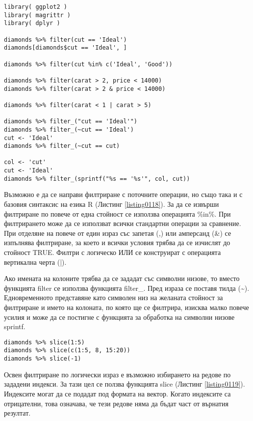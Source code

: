 \begin{lstlisting}[caption=Филтриране на редове, label=listing0118]
library( ggplot2 )
library( magrittr )
library( dplyr )

diamonds %>% filter(cut == 'Ideal')
diamonds[diamonds$cut == 'Ideal', ]

diamonds %>% filter(cut %in% c('Ideal', 'Good'))

diamonds %>% filter(carat > 2, price < 14000)
diamonds %>% filter(carat > 2 & price < 14000)

diamonds %>% filter(carat < 1 | carat > 5)

diamonds %>% filter_("cut == 'Ideal'")
diamonds %>% filter_(~cut == 'Ideal')
cut <- 'Ideal'
diamonds %>% filter_(~cut == cut)

col <- 'cut'
cut <- 'Ideal'
diamonds %>% filter_(sprintf("%s == '%s'", col, cut))
\end{lstlisting}

Възможно е да се направи филтриране с поточните операции, но също така и с базовия синтаксис на езика R (Листинг \ref{listing0118}). За да се извърши филтриране по повече от една стойност се използва операцията \%in\%. При филтрирането може да се използват всички стандартни операции за сравнение. При отделяне на повече от един израз със запетая (,) или амперсанд (\&) се изпълнява филтриране, за което и всички условия трябва да се изчислят до стойност TRUE. Филтри с логическо ИЛИ се конструират с операцията вертикална черта (|).

Ако имената на колоните трябва да се зададат със символни низове, то вместо функцията filter се използва функцията filter\_. Пред израза се поставя тилда (\textasciitilde). Едновременното представяне като символен низ на желаната стойност за филтриране и името на колоната, по която ще се филтрира, изисква малко повече усилия и може да се постигне с функцията за обработка на символни низове sprintf.

\begin{lstlisting}[caption=Избор по индекси, label=listing0119]
diamonds %>% slice(1:5)
diamonds %>% slice(c(1:5, 8, 15:20))
diamonds %>% slice(-1)
\end{lstlisting}

Освен филтриране по логически израз е възможно избирането на редове по зададени индекси. За тази цел се ползва функцията slice (Листинг \ref{listing0119}). Индексите могат да се подадат под формата на вектор. Когато индексите са отрицателни, това означава, че тези редове няма да бъдат част от върнатия резултат.

